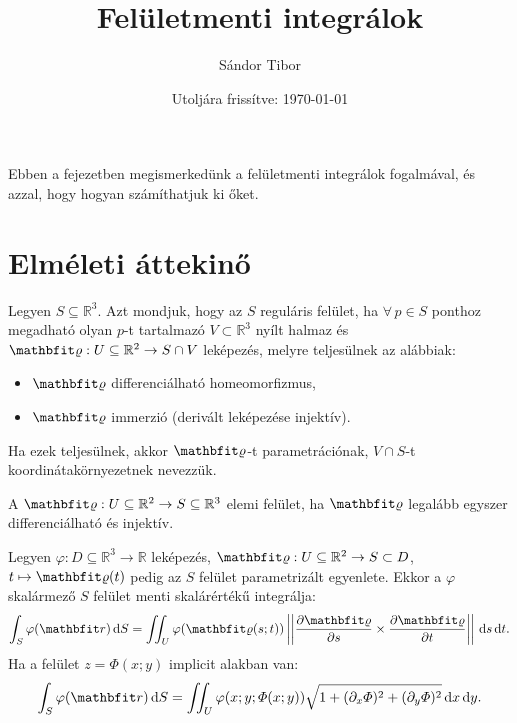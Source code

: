 \documentclass[lang=magyar]{math-handout}
\title{Felületmenti integrálok}
\date{Utoljára frissítve: \today}
\author{Sándor Tibor}
\begin{document}
\allowdisplaybreaks

\maketitle

\vspace{1em}

\begin{summary}
  Ebben a fejezetben megismerkedünk a felületmenti integrálok fogalmával, és
  azzal, hogy hogyan számíthatjuk ki őket.
\end{summary}

\vspace{-1em}

\section{Elméleti áttekinő}

\vspace{1em}

\begin{definition}
  Legyen $S \subseteq \mathbb R^3$. Azt mondjuk, hogy az $S$ reguláris felület,
  ha $\forall \, p \in S$ ponthoz megadható olyan $p$-t tartalmazó $V \subset
    \mathbb R^3$ nyílt halmaz és $\rvec \varrho : U \subseteq \mathbb R^2
    \rightarrow S \cap V$ leképezés, melyre teljesülnek az alábbiak:
  \begin{itemize}
    \item $\rvec \varrho$ differenciálható homeomorfizmus,

    \item $\rvec \varrho$ immerzió (derivált leképezése injektív).
  \end{itemize}
  Ha ezek teljesülnek, akkor $\rvec \varrho$-t parametrációnak,
  $V \cap S$-t  koordinátakörnyezetnek nevezzük.
\end{definition}

\vfill

\begin{definition}
  A $\rvec \varrho: U \subseteq \mathbb R^2 \rightarrow S \subseteq \mathbb R^3$
  elemi felület, ha $\rvec \varrho$ legalább egyszer differenciálható és
  injektív.
\end{definition}

\vfill

\begin{definition}
  Legyen $\varphi: D \subseteq \mathbb R^3 \rightarrow \mathbb R$ leképezés,
  $\rvec \varrho: U \subseteq \mathbb R^2 \rightarrow S \subset D$, $t \mapsto
    \rvec \varrho(t)$ pedig az $S$ felület parametrizált egyenlete. Ekkor a
  $\varphi$ skalármező $S$ felület menti skalárértékű integrálja:
  \[
    \int_S \varphi (\rvec r) \, \diff S =
    \iint_U \varphi (\rvec \varrho(s; t))
    \norma{\pdv{\rvec \varrho}{s} \times \pdv{\rvec \varrho}{t}}
    \, \diff s \, \diff t
    \text.
  \]
  Ha a felület $z = \varPhi(x; y)$ implicit alakban van:
  \[
    \int_S \varphi (\rvec r) \, \diff S =
    \iint_U \varphi (x; y; \varPhi(x;y))
    \sqrt{1 + (\partial_x \varPhi)^2 + (\partial_y \varPhi)^2}
    \, \diff x \, \diff y
    \text.
  \]
\end{definition}
\end{document}
